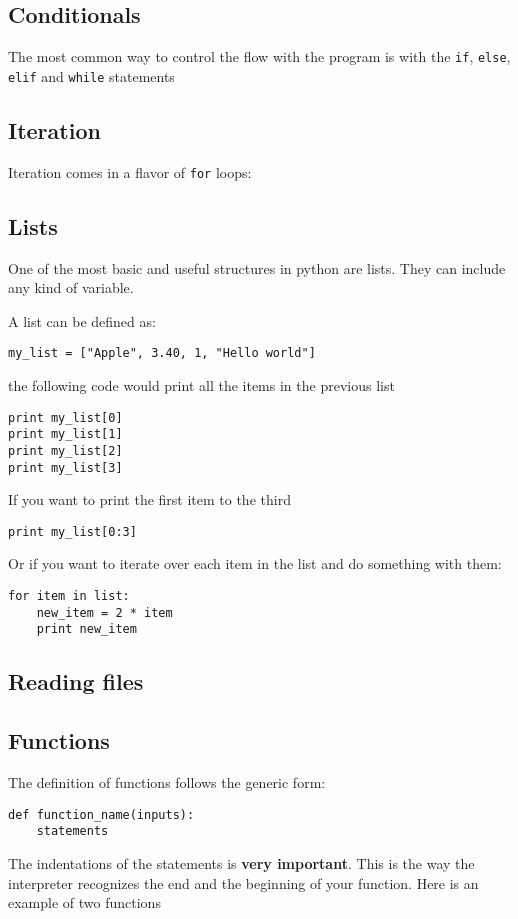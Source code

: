\documentclass{article}
\begin{document}
\subsection{Conditionals}
The most common way to control the flow with the program is with the
\verb"if", \verb"else", \verb"elif" and \verb"while" statements




\subsection{Iteration}
Iteration comes in a flavor of \verb"for" loops:



\subsection{Lists}
One of the most basic and useful structures in python are lists. They
can include any kind of variable.

A list can be defined as:
\begin{verbatim}
my_list = ["Apple", 3.40, 1, "Hello world"]
\end{verbatim}

the following code would print all the items in the previous list
\begin{verbatim}
print my_list[0]
print my_list[1]
print my_list[2]
print my_list[3]
\end{verbatim}

If you want to print the first item to the third

\begin{verbatim}
print my_list[0:3]
\end{verbatim}

Or if you want to iterate over each item in the list and do something
with them:

\begin{verbatim}
for item in list:
    new_item = 2 * item
    print new_item
\end{verbatim}

\subsection{Reading files}



\subsection{Functions}
The definition of functions follows the generic form:

\begin{verbatim}
def function_name(inputs):
    statements
\end{verbatim}

The indentations of the statements is {\bf very important}.  This is
the way the interpreter recognizes the end and the beginning of your
function. Here is an example of two functions   



\end{document}

